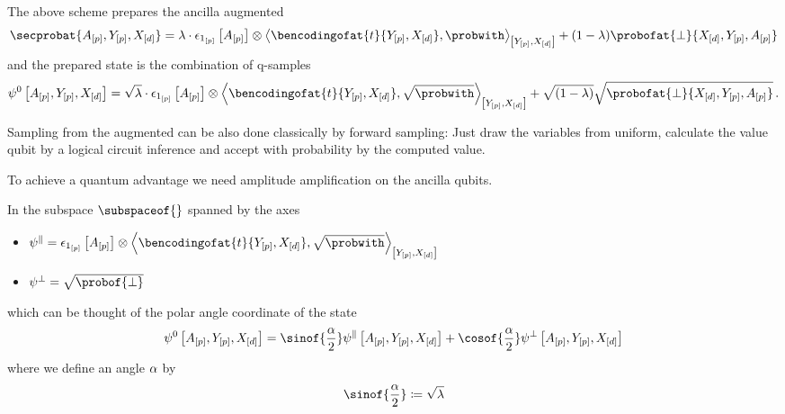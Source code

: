 The above scheme prepares the ancilla augmented \ComputationActivationNetwork{}
\begin{align*}
    \secprobat{\avariables,\headvariables,\shortcatvariables}
    = \acceptanceprob \cdot \onehotmapofat{1_{[\seldim]}}{\avariables}
    \otimes \contractionof{\bencodingofat{\sstat}{\headvariables,\shortcatvariables},\probwith}{\headvariables,\shortcatvariables}
    + (1-\acceptanceprob) \probofat{\perp}{\shortcatvariables,\headvariables,\avariables}
\end{align*}
and the prepared state is the combination of q-samples
\begin{align*}
    \qstateofat{0}{\avariables,\headvariables,\shortcatvariables}
    = \sqrt{\acceptanceprob} \cdot \onehotmapofat{1_{[\seldim]}}{\avariables}
    \otimes \contractionof{\bencodingofat{\sstat}{\headvariables,\shortcatvariables},\sqrt{\probwith}}{\headvariables,\shortcatvariables}
    + \sqrt{(1-\acceptanceprob)} \sqrt{\probofat{\perp}{\shortcatvariables,\headvariables,\avariables}} \, .
\end{align*}

Sampling from the augmented \ComputationActivationNetwork{} can be also done classically by forward sampling:
Just draw the variables from uniform, calculate the value qubit by a logical circuit inference and accept with probability by the computed value.

To achieve a quantum advantage we need amplitude amplification on the ancilla qubits.

In the subspace $\subspaceof{}$ spanned by the axes
\begin{itemize}
    \item $\qstateof{\goodstatesymbol}=\onehotmapofat{1_{[\seldim]}}{\avariables}\otimes \contractionof{\bencodingofat{\sstat}{\headvariables,\shortcatvariables},\sqrt{\probwith}}{\headvariables,\shortcatvariables}$
    \item $\qstateof{\badstatesymbol}=\sqrt{\probof{\perp}}$
\end{itemize}
which can be thought of the polar angle coordinate of the state
\begin{align*}
    \qstateofat{0}{\avariables,\headvariables,\shortcatvariables}
    = \sinof{\frac{\rotanglesymbol}{2}} \qstateofat{\goodstatesymbol}{\avariables,\headvariables,\shortcatvariables}
    + \cosof{\frac{\rotanglesymbol}{2}} \qstateofat{\badstatesymbol}{\avariables,\headvariables,\shortcatvariables}
\end{align*}
where we define an angle $\alpha$ by
\begin{align*}
    \sinof{\frac{\rotanglesymbol}{2}} \coloneqq \sqrt{\acceptanceprob}
\end{align*}

